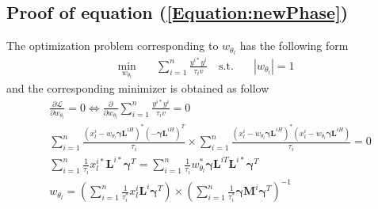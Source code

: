 \subsection{Proof of equation (\ref{Equation:newPhase})} %
\noindent
The optimization problem corresponding to $w_{\theta_{l}}$  has the following form
\begin{equation*}
    \begin{aligned}
        \min_{w_{\theta_l}} \quad & \sum_{i=1}^n  \frac{y^{i*} y^i}{\tau_i v} 
    \quad \text{s.t.} \quad & |w_{\theta_{l}}| = 1
    \end{aligned}
    \label{Equation:problem_w_app}
\end{equation*}
and the corresponding minimizer is obtained as follow
\begin{align*}
    &\frac{\partial \mathcal{L}}{\partial w_{\theta_{l}}} = 0 \Longleftrightarrow
    \frac{\partial }{\partial w_{\theta_{l}}} \sum_{i=1}^n  \frac{y^{i*} y^i}{\tau_i v} = 0 \\
    & \sum_{i=1}^n \frac{ (x_{l}^i - w_{\theta_{l}} \boldsymbol{\gamma} \mathbf{L}^{iH})^* (- \boldsymbol{\gamma} \mathbf{L}^{iH})^T}{\tau_i} \times  \sum_{i=1}^n \frac{(x_{l}^i - w_{\theta_{l}} \boldsymbol{\gamma} \mathbf{L}^{iH})^*(x_{l}^i - w_{\theta_{l}} \boldsymbol{\gamma} \mathbf{L}^{iH})}{\tau_i} = 0 \\
    & \sum_{i=1}^n \frac{1}{\tau_i} x_{l}^{i*} \mathbf{L}^{i*} \boldsymbol{\gamma}^T = \sum_{i=1}^n \frac{1}{\tau_i} w_{\theta_{l}}^* \boldsymbol{\gamma} \mathbf{L}^{iT} \mathbf{L}^{i*} \boldsymbol{\gamma}^T \\
    &w_{\theta_{l}} = \left( \sum_{i=1}^n \frac{1}{\tau_i^*} x_{l}^{i} \mathbf{L}^{i} \boldsymbol{\gamma}^T \right) \times \left( \sum_{i=1}^n \frac{1}{\tau_i^*} \boldsymbol{\gamma} \mathbf{M}^i \boldsymbol{\gamma}^T \right)^{-1}
\end{align*}
